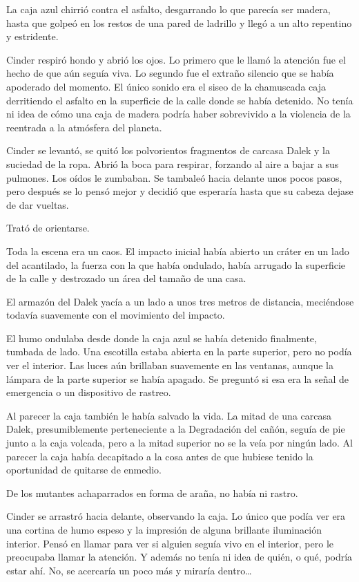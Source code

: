La caja azul chirrió contra el asfalto, desgarrando lo que parecía ser madera, hasta que golpeó en los restos de una pared de ladrillo y llegó a un alto repentino y estridente. 

Cinder respiró hondo y abrió los ojos. Lo primero que le llamó la atención fue el hecho de que aún seguía viva. Lo segundo fue el extraño silencio que se había apoderado del momento. El único sonido era el siseo de la chamuscada caja derritiendo el asfalto en la superficie de la calle donde se había detenido. No tenía ni idea de cómo una caja de madera podría haber sobrevivido a la violencia de la reentrada a la atmósfera del planeta. 

Cinder se levantó, se quitó los polvorientos fragmentos de carcasa Dalek y la suciedad de la ropa. Abrió la boca para respirar, forzando al aire a bajar a sus pulmones. Los oídos le zumbaban. Se tambaleó hacia delante unos pocos pasos, pero después se lo pensó mejor y decidió que esperaría hasta que su cabeza dejase de dar vueltas. 

Trató de orientarse. 

Toda la escena era un caos. El impacto inicial había abierto un cráter en un lado del acantilado, la fuerza con la que había ondulado, había arrugado la superficie de la calle y destrozado un área del tamaño de una casa. 

El armazón del Dalek yacía a un lado a unos tres metros de distancia, meciéndose todavía suavemente con el movimiento del impacto. 

El humo ondulaba desde donde la caja azul se había detenido finalmente, tumbada de lado. Una escotilla estaba abierta en la parte superior, pero no podía ver el interior. Las luces aún brillaban suavemente en las ventanas, aunque la lámpara de la parte superior se había apagado. Se preguntó si esa era la señal de emergencia o un dispositivo de rastreo. 

Al parecer la caja también le había salvado la vida. La mitad de una carcasa Dalek, presumiblemente perteneciente a la Degradación del cañón, seguía de pie junto a la caja volcada, pero a la mitad superior no se la veía por ningún lado. Al parecer la caja había decapitado a la cosa antes de que hubiese tenido la oportunidad de quitarse de enmedio. 

De los mutantes achaparrados en forma de araña, no había ni rastro. 

Cinder se arrastró hacia delante, observando la caja. Lo único que podía ver era una cortina de humo espeso y la impresión de alguna brillante iluminación interior. Pensó en llamar para ver si alguien seguía vivo en el interior, pero le preocupaba llamar la atención. Y además no tenía ni idea de quién, o qué, podría estar ahí. No, se acercaría un poco más y miraría dentro… 

